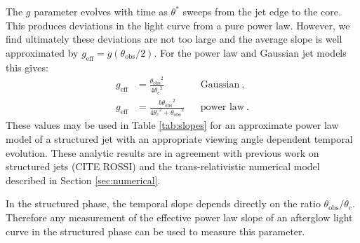 \documentclass[twocolumn]{aastex62}
\newcommand{\tobs}{\ensuremath{t_{\mathrm{obs}}}}
\newcommand{\thobs}{\ensuremath{\theta_{\mathrm{obs}}}}
\newcommand{\thC}{\ensuremath{\theta_{\mathrm{c}}}}
\newcommand{\geff}{\ensuremath{g_{\mathrm{eff}}}}
\begin{document}

The $g$ parameter evolves with time as $\theta^*$ sweeps from the jet edge to the core.  This produces deviations in the light curve from a pure power law.  However, we find ultimately these deviations are not too large and the average slope is well approximated by $\geff  = g(\thobs/2)$.  For the power law and Gaussian jet models this gives:
\begin{align}
	\geff &= \frac{\thobs^2}{4\thC^2} && \text{Gaussian}\ , \\
	\geff &= \frac{b \thobs^2}{4 \thC^2+\thobs^2} && \text{power law}\ . \label{eq:geff}
\end{align}
These values may be used in Table \ref{tab:slopes} for an approximate power law model of a structured jet with an appropriate viewing angle dependent temporal evolution.  These analytic results are in agreement with previous work on structured jets (CITE ROSSI) and the trans-relativistic numerical model described in Section \ref{sec:numerical}.

In the structured phase, the temporal slope depends directly on the ratio $\thobs/\thC$.  Therefore any measurement of the effective power law slope of an afterglow light curve in the structured phase can be used to measure this parameter.
\end{document}
